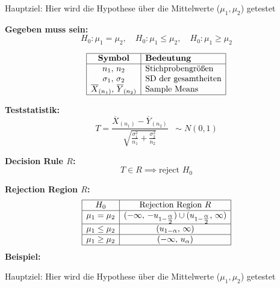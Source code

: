 \begin{center}

\columnbreak
{}

Hauptziel: Hier wird die Hypothese über die
Mittelwerte ($\mu_1, \mu_2$) getestet
\end{center}

\begin{center}
\end{center}

\large{\textbf{Gegeben muss sein:}}
\[
H_0: \mu_1 = \mu_2, \quad 
H_0: \mu_1 \leq \mu_2, \quad 
H_0: \mu_1 \geq \mu_2
\]

\[
\begin{array}{|c|l|}
\hline
\textbf{Symbol} & \textbf{Bedeutung} \\
\hline
n_1,\,n_2 & \text{Stichprobengrößen} \\
\sigma_1,\,\sigma_2 & \text{SD der gesamtheiten} \\
\overline{X}_{(n_1)},\,\overline{Y}_{(n_2)} & \text{Sample Means} \\
\hline
\end{array}
\]

\normalsize

\large{\textbf{Teststatistik:}}
\[
T = \frac{\overline{X}_{(n_1)} - \overline{Y}_{(n_2)}}
{\sqrt{\frac{\sigma_1^2}{n_1} + \frac{\sigma_2^2}{n_2}}}
\;\;\sim N(0,1)
\]

\large{\textbf{Decision Rule \(R\):}}
\[
T \in R \implies \text{reject } H_0
\]

\large{\textbf{Rejection Region \(R\):}}
\[
\begin{array}{|c|c|}
\hline
H_0 & \text{Rejection Region } R \\ \hline
\mu_1 = \mu_2 
  & (-\infty,\,-u_{1-\tfrac{\alpha}{2}})\cup(u_{1-\tfrac{\alpha}{2}},\,\infty) \\ \hline
\mu_1 \leq \mu_2 
  & (u_{1-\alpha},\,\infty) \\ \hline
\mu_1 \geq \mu_2 
  & (-\infty,\,u_{\alpha}) \\ \hline
\end{array}
\]
\large{\textbf{Beispiel:}}
\columnbreak
\normalsize
\begin{center}
\normalsize
Hauptziel: Hier wird die Hypothese über die
Mittelwerte ($\mu_1, \mu_2$) getestet
\end{center}
\normalsize
\begin{center}
\end{center}

